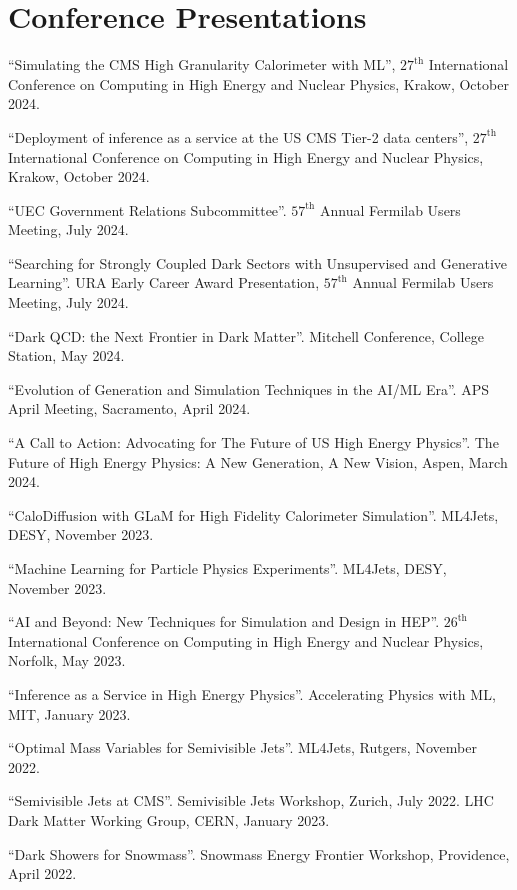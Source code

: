 \section{Conference Presentations}
\begin{description}[leftmargin=12pt,font=\normalfont,labelsep=0em]
\item ``Simulating the CMS High Granularity Calorimeter with ML'', $27^{\text{th}}$ International Conference on Computing in High Energy and Nuclear Physics, Krakow, October 2024.
\item ``Deployment of inference as a service at the US CMS Tier-2 data centers'', $27^{\text{th}}$ International Conference on Computing in High Energy and Nuclear Physics, Krakow, October 2024.
\item ``UEC Government Relations Subcommittee''. $57^{\text{th}}$ Annual Fermilab Users Meeting, July 2024.
\item ``Searching for Strongly Coupled Dark Sectors with Unsupervised and Generative Learning''. URA Early Career Award Presentation, $57^{\text{th}}$ Annual Fermilab Users Meeting, July 2024.
\item ``Dark QCD: the Next Frontier in Dark Matter''. Mitchell Conference, College Station, May 2024.
\item ``Evolution of Generation and Simulation Techniques in the AI/ML Era''. APS April Meeting, Sacramento, April 2024.
\item ``A Call to Action: Advocating for The Future of US High Energy Physics''. The Future of High Energy Physics: A New Generation, A New Vision, Aspen, March 2024.
\item ``CaloDiffusion with GLaM for High Fidelity Calorimeter Simulation''. ML4Jets, DESY, November 2023.
\item ``Machine Learning for Particle Physics Experiments''. ML4Jets, DESY, November 2023.
\item ``AI and Beyond: New Techniques for Simulation and Design in HEP''. $26^{\text{th}}$ International Conference on Computing in High Energy and Nuclear Physics, Norfolk, May 2023.
\item ``Inference as a Service in High Energy Physics''. Accelerating Physics with ML, MIT, January 2023.
\item ``Optimal Mass Variables for Semivisible Jets''. ML4Jets, Rutgers, November 2022.
\item ``Semivisible Jets at CMS''. Semivisible Jets Workshop, Zurich, July 2022. LHC Dark Matter Working Group, CERN, January 2023.
\item ``Dark Showers for Snowmass''. Snowmass Energy Frontier Workshop, Providence, April 2022.

\end{description}
